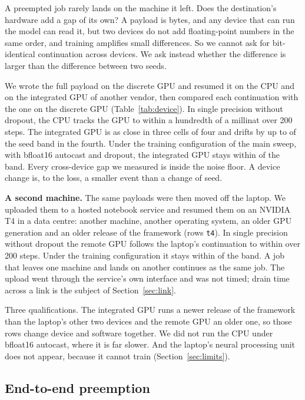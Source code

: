 A preempted job rarely lands on the machine it left. Does the destination's hardware add a gap of its own? A payload
is bytes, and any device that can run the model can read it, but two devices do not add floating-point numbers in the
same order, and training amplifies small differences. So we cannot ask for bit-identical continuation across devices.
We ask instead whether the difference is larger than the difference between two seeds.

We wrote the full payload on the discrete GPU and resumed it on the CPU and on the integrated GPU of another vendor,
then compared each continuation with the one on the discrete GPU (Table~\ref{tab:device}). In single precision without
dropout, the CPU tracks the GPU to within a hundredth of a millinat over 200 steps. The integrated GPU is as close in
three cells of four and drifts by up to \devWorstXpuFp{} of the seed band in the fourth. Under the training
configuration of the main sweep, with bfloat16 autocast and dropout, the integrated GPU stays within
\devWorstXpuAmp{} of the band. Every cross-device gap we measured is inside the noise floor. A device change is, to
the loss, a smaller event than a change of seed.

\textbf{A second machine.} The same payloads were then moved off the laptop. We uploaded them to a hosted notebook
service and resumed them on an NVIDIA T4 in a data centre: another machine, another operating system, an older GPU
generation and an older release of the framework (rows \texttt{t4}). In single precision without dropout the remote
GPU follows the laptop's continuation to within \devMaxTfourFp\mnats{} over 200 steps. Under the training
configuration it stays within \devWorstTfourAmp{} of the band. A job that leaves one machine and lands on another
continues as the same job. The upload went through the service's own interface and was not timed; drain time across a
link is the subject of Section~\ref{sec:link}.

Three qualifications. The integrated GPU runs a newer release of the framework than the laptop's other two devices and
the remote GPU an older one, so those rows change device and software together. We did not run the CPU under bfloat16 autocast, where it is far slower. And the laptop's neural processing unit does not appear, because it cannot train
(Section~\ref{sec:limits}).

\subsection{End-to-end preemption}
\label{sec:chaos}

